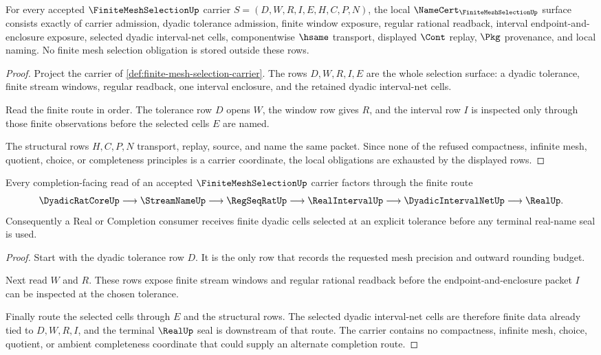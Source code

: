 \begin{theorem}
\label{thm:finite-mesh-selection-namecert-obligations}
For every accepted $\FiniteMeshSelectionUp$ carrier $S=(D,W,R,I,E,H,C,P,N)$, the local $\NameCert_{\FiniteMeshSelectionUp}$ surface consists exactly of carrier admission, dyadic tolerance admission, finite window exposure, regular rational readback, interval endpoint-and-enclosure exposure, selected dyadic interval-net cells, componentwise $\hsame$ transport, displayed $\Cont$ replay, $\Pkg$ provenance, and local naming. No finite mesh selection obligation is stored outside these rows.
\end{theorem}
\begin{proof}
Project the carrier of \autoref{def:finite-mesh-selection-carrier}. The rows $D,W,R,I,E$ are the whole selection surface: a dyadic tolerance, finite stream windows, regular readback, one interval enclosure, and the retained dyadic interval-net cells.

Read the finite route in order. The tolerance row $D$ opens $W$, the window row gives $R$, and the interval row $I$ is inspected only through those finite observations before the selected cells $E$ are named.

The structural rows $H,C,P,N$ transport, replay, source, and name the same packet. Since none of the refused compactness, infinite mesh, quotient, choice, or completeness principles is a carrier coordinate, the local obligations are exhausted by the displayed rows.
\end{proof}

\begin{theorem}
\label{thm:finite-mesh-selection-real-completion-route}
Every completion-facing read of an accepted $\FiniteMeshSelectionUp$ carrier factors through the finite route
$$
\DyadicRatCoreUp \longrightarrow \StreamNameUp \longrightarrow \RegSeqRatUp \longrightarrow \RealIntervalUp \longrightarrow \DyadicIntervalNetUp \longrightarrow \RealUp .
$$
Consequently a Real or Completion consumer receives finite dyadic cells selected at an explicit tolerance before any terminal real-name seal is used.
\end{theorem}
\begin{proof}
Start with the dyadic tolerance row $D$. It is the only row that records the requested mesh precision and outward rounding budget.

Next read $W$ and $R$. These rows expose finite stream windows and regular rational readback before the endpoint-and-enclosure packet $I$ can be inspected at the chosen tolerance.

Finally route the selected cells through $E$ and the structural rows. The selected dyadic interval-net cells are therefore finite data already tied to $D,W,R,I$, and the terminal $\RealUp$ seal is downstream of that route. The carrier contains no compactness, infinite mesh, choice, quotient, or ambient completeness coordinate that could supply an alternate completion route.
\end{proof}

